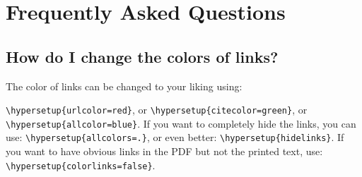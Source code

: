
\chapter{Frequently Asked Questions} %
\label{ch:appendix}

\section{How do I change the colors of links?}

The color of links can be changed to your liking using:

{\small\verb!\hypersetup{urlcolor=red}!}, or
{\small\verb!\hypersetup{citecolor=green}!}, or
{\small\verb!\hypersetup{allcolor=blue}!}.
\noindent If you want to completely hide the links, you can use:
{\small\verb!\hypersetup{allcolors=.}!}, or even better:
{\small\verb!\hypersetup{hidelinks}!}.
\noindent If you want to have obvious links in the PDF but not the printed text, use:
{\small\verb!\hypersetup{colorlinks=false}!}.
